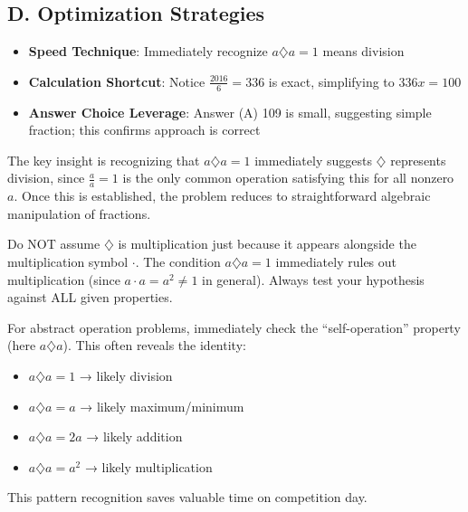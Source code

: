 \documentclass[11pt]{article}
\begin{document}
\begin{competitionbox}
\subsection*{D. Optimization Strategies}
\begin{itemize}[leftmargin=*]
    \item \textbf{Speed Technique}: Immediately recognize $a \diamondsuit a = 1$ means division
    \item \textbf{Calculation Shortcut}: Notice $\frac{2016}{6} = 336$ is exact, simplifying to $336x = 100$
    \item \textbf{Answer Choice Leverage}: Answer (A) 109 is small, suggesting simple fraction; this confirms approach is correct
\end{itemize}
\end{competitionbox}

\begin{keyinsightbox}
The key insight is recognizing that $a \diamondsuit a = 1$ immediately suggests $\diamondsuit$ represents division, since $\frac{a}{a} = 1$ is the only common operation satisfying this for all nonzero $a$. Once this is established, the problem reduces to straightforward algebraic manipulation of fractions.
\end{keyinsightbox}

\begin{warningbox}
Do NOT assume $\diamondsuit$ is multiplication just because it appears alongside the multiplication symbol $\cdot$. The condition $a \diamondsuit a = 1$ immediately rules out multiplication (since $a \cdot a = a^2 \neq 1$ in general). Always test your hypothesis against ALL given properties.
\end{warningbox}

\begin{tipbox}
For abstract operation problems, immediately check the ``self-operation'' property (here $a \diamondsuit a$). This often reveals the identity:
\begin{itemize}
    \item $a \diamondsuit a = 1$ → likely division
    \item $a \diamondsuit a = a$ → likely maximum/minimum
    \item $a \diamondsuit a = 2a$ → likely addition
    \item $a \diamondsuit a = a^2$ → likely multiplication
\end{itemize}
This pattern recognition saves valuable time on competition day.
\end{tipbox}
\end{document}
